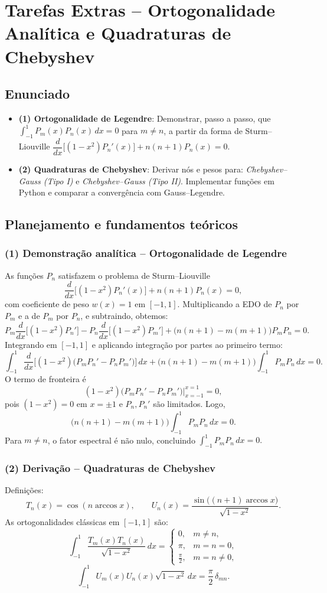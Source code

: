 \documentclass[12pt,a4paper]{article}
\begin{document}
\section{Tarefas Extras – Ortogonalidade Analítica e Quadraturas de Chebyshev}

\subsection{Enunciado}
\begin{itemize}
  \item \textbf{(1) Ortogonalidade de Legendre}: Demonstrar, passo a passo, que
  \(
  \int_{-1}^{1} P_m(x)P_n(x)\,dx = 0
  \) para \(m\neq n\), a partir da forma de Sturm–Liouville
  \(
  \dfrac{d}{dx}\!\big[(1-x^2)P_n'(x)\big] + n(n+1)P_n(x) = 0.
  \)
  \item \textbf{(2) Quadraturas de Chebyshev}: Derivar nós e pesos para:
  \emph{Chebyshev–Gauss (Tipo I)} e \emph{Chebyshev–Gauss (Tipo II)}.
  Implementar funções em Python e comparar a convergência com Gauss–Legendre.
\end{itemize}

\subsection{Planejamento e fundamentos teóricos}
\subsubsection*{(1) Demonstração analítica – Ortogonalidade de Legendre}
As funções \(P_n\) satisfazem o problema de Sturm–Liouville
\[
\frac{d}{dx}\!\big[(1-x^2)P_n'(x)\big] + n(n+1)P_n(x)=0,
\]
com coeficiente de peso \(w(x)=1\) em \([-1,1]\). Multiplicando a EDO de \(P_n\) por \(P_m\) e a de \(P_m\) por \(P_n\), e subtraindo, obtemos:
\[
P_m\frac{d}{dx}\!\big[(1-x^2)P_n'\big] - P_n\frac{d}{dx}\!\big[(1-x^2)P_m'\big]
+ \big(n(n+1)-m(m+1)\big)P_m P_n = 0.
\]
Integrando em \([-1,1]\) e aplicando integração por partes ao primeiro termo:
\[
\int_{-1}^{1}\!\frac{d}{dx}\!\Big[(1-x^2)\big(P_m P_n' - P_n P_m'\big)\Big]\,dx
+ \big(n(n+1)-m(m+1)\big)\!\int_{-1}^{1}\!P_mP_n\,dx = 0.
\]
O termo de fronteira é
\[
(1-x^2)\big(P_m P_n' - P_n P_m'\big)\Big|_{x=-1}^{x=1}=0,
\]
pois \((1-x^2)=0\) em \(x=\pm 1\) e \(P_n, P_n'\) são limitados. Logo,
\[
\big(n(n+1)-m(m+1)\big)\!\int_{-1}^{1}\!P_mP_n\,dx = 0.
\]
Para \(m\neq n\), o fator espectral é não nulo, concluindo
\(
\int_{-1}^{1} P_mP_n\,dx=0.
\)

\subsubsection*{(2) Derivação – Quadraturas de Chebyshev}
Definições:
\[
T_n(x)=\cos(n\arccos x),\qquad U_n(x)=\frac{\sin\big((n+1)\arccos x\big)}{\sqrt{1-x^2}}.
\]
As ortogonalidades clássicas em \([-1,1]\) são:
\[
\int_{-1}^{1}\frac{T_m(x)T_n(x)}{\sqrt{1-x^2}}\,dx =
\begin{cases}
0, & m\neq n,\\
\pi, & m=n=0,\\
\frac{\pi}{2}, & m=n\neq 0,
\end{cases}
\]
\[
\int_{-1}^{1}U_m(x)U_n(x)\sqrt{1-x^2}\,dx = \frac{\pi}{2}\,\delta_{mn}.
\]
\end{document}
